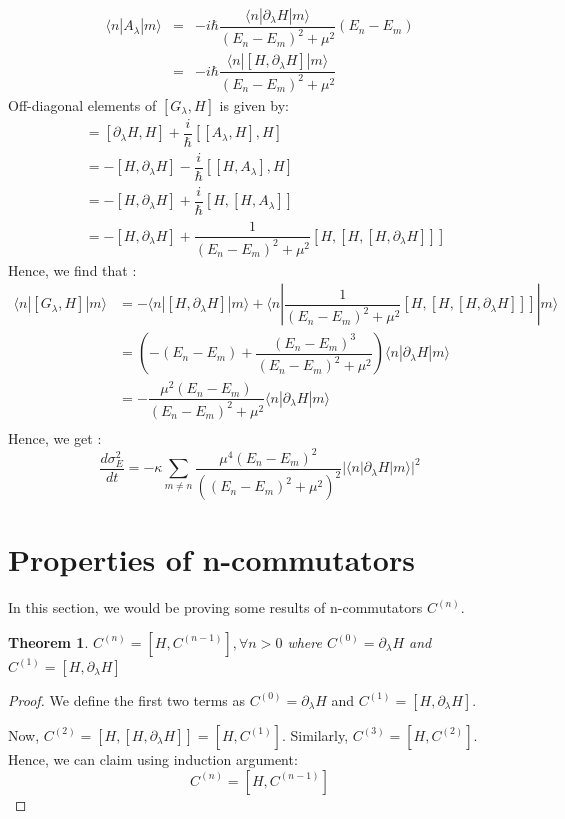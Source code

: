 \documentclass[11pt,a4paper]{article}
\newtheorem{thm}{Theorem}
\begin{document}
\begin{eqnarray}
\langle n | A_{\lambda} | m \rangle &=&  -i \hbar \dfrac{\langle n | \partial_{\lambda}H  | m \rangle}{(E_n-E_m)^2 + \mu^2} (E_n-E_m) \\
&=&  -i \hbar \dfrac{\langle n | [H, \partial_{\lambda} H]  | m \rangle}{(E_n-E_m)^2 + \mu^2} 
\end{eqnarray}
Off-diagonal elements of $[G_{\lambda}, H]$ is given by:
\begin{align}
 [G_{\lambda}, H] &= [\partial_{\lambda} H,H] + \dfrac{i}{\hbar} [[A_{\lambda} , H],H] \\
  &= -[H,\partial_{\lambda} H] - \dfrac{i}{\hbar} [[H,A_{\lambda}],H] \\
    &= -[H,\partial_{\lambda} H] + \dfrac{i}{\hbar} [H,[H,A_{\lambda}]] \\
 &=  -[H,\partial_{\lambda} H] + \dfrac{1}{(E_n-E_m)^2 + \mu^2}  [H,[H, [H, \partial_{\lambda} H]]]
 \end{align}
Hence, we find that :
\begin{align*}
\langle n |  [G_{\lambda}, H]|  m \rangle  &=  - \langle n |[H,\partial_{\lambda} H] |m \rangle +\langle n| \dfrac{1}{(E_n-E_m)^2 + \mu^2}  [H,[H, [H, \partial_{\lambda} H]]] | m\rangle \\
 &=  \left(-(E_n- E_m) + \dfrac{(E_n- E_m)^3}{(E_n-E_m)^2 + \mu^2} \right)  \langle n |\partial_{\lambda} H |m \rangle \\
 &=  -\dfrac{\mu^2 (E_n- E_m)}{(E_n-E_m)^2 + \mu^2}  \langle n |\partial_{\lambda} H |m \rangle \\
\end{align*}
Hence, we get :
\begin{equation}
\boxed{
\dfrac{d \sigma^2_E}{dt} =  - \kappa  \sum_{m \neq n}\dfrac{\mu^4 (E_n- E_m)^2}{((E_n-E_m)^2 + \mu^2)^2}  |\langle n |\partial_{\lambda} H |m \rangle|^2}
\end{equation}


\section{Properties of n-commutators}\label{sec.Cn}
In this section, we would be proving some results of n-commutators $C^{(n)}$.

 
\begin{thm}
$C^{(n)}= [H, C^{(n-1)}],  \forall n>0$ where $C^{(0)}=  \partial_{\lambda}H$ and  $C^{(1)}= [H, \partial_{\lambda}H]$
\end{thm}
\begin{proof}
We define the first two terms  as $C^{(0)}=  \partial_{\lambda}H$ and $C^{(1)}= [H, \partial_{\lambda}H]$. 


Now, $C^{(2)}= [H,[H, \partial_{\lambda}H]]= [H, C^{(1)}]$. Similarly, $C^{(3)}=  [H, C^{(2)}]$. Hence, we can claim using induction argument:
\begin{equation}
C^{(n)}= [H, C^{(n-1)}]
\end{equation}
\end{proof}
 
\end{document}
